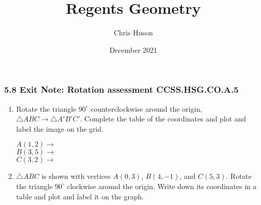 \documentclass[12pt, twoside]{article}
\title{Regents Geometry}
\author{Chris Huson}
\date{December 2021}
\begin{document}
\subsubsection*{5.8 Exit Note: Rotation assessment \hfill CCSS.HSG.CO.A.5}
\begin{enumerate}
\item Rotate the triangle $90^\circ$ counterclockwise around the origin, $\triangle ABC \rightarrow \triangle A'B'C'$. Complete the table of the coordinates and plot and label the image on the grid. \vspace{0.25cm}
  \begin{multicols}{2}
    $A(1,2) \rightarrow$ \\[0.7cm]
    $B(3,5) \rightarrow$ \\[0.7cm]
    $C(3,2) \rightarrow$ \\[0.7cm]
    \end{multicols}
  
\item $\triangle ABC$ is shown with vertices $A(0,3)$, $B(4,-1)$, and $C(5,3)$. Rotate the triangle $90^\circ$ clockwise around the origin. Write down its coordinates in a table and plot and label it on the graph.
  \begin{flushright}
  \end{flushright}

\newpage

\end{enumerate}
\end{document}
